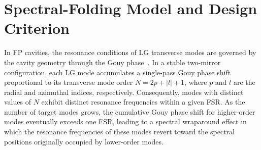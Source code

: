 \documentclass{optica-article}
\begin{document}
\section{Spectral-Folding Model and Design Criterion}

In FP cavities, the resonance conditions of LG transverse modes are governed by the cavity geometry through the Gouy phase~\cite{Kogelnik1966,Siegman1986}. In a stable two-mirror configuration, each LG mode accumulates a single-pass Gouy phase shift proportional to its transverse mode order $N=2p+|l|+1$, where $p$ and $l$ are the radial and azimuthal indices, respectively. Consequently, modes with distinct values of $N$ exhibit distinct resonance frequencies within a given FSR. As the number of target modes grows, the cumulative Gouy phase shift for higher-order modes eventually exceeds one FSR, leading to a spectral wraparound effect in which the resonance frequencies of these modes revert toward the spectral positions originally occupied by lower-order modes.
\end{document}
